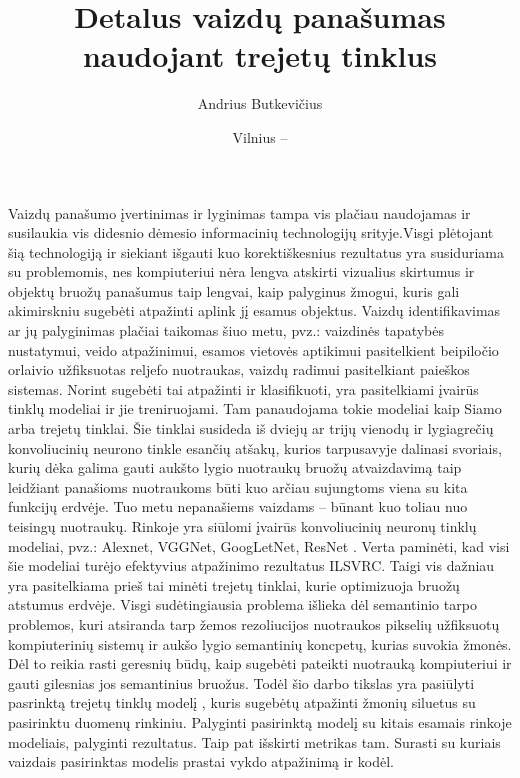 \documentclass{VUMIFPSkursinis}
\title{Detalus vaizdų panašumas naudojant trejetų tinklus}
\author{Andrius Butkevičius}
\date{Vilnius – \the\year }
\DeclareRobustCommand{\[}{\begin{equation}}
\DeclareRobustCommand{\]}{\end{equation}}
\begin{document}
\maketitle
\thispagestyle{empty} 

\tableofcontents



\thispagestyle{empty} 
Vaizdų panašumo įvertinimas ir lyginimas tampa vis plačiau naudojamas ir susilaukia vis didesnio dėmesio informacinių technologijų srityje.Visgi plėtojant šią technologiją ir siekiant išgauti kuo korektiškesnius rezultatus yra susiduriama su problemomis, nes kompiuteriui nėra lengva atskirti vizualius skirtumus ir objektų bruožų panašumus taip lengvai, kaip palyginus žmogui, kuris gali akimirskniu sugebėti atpažinti aplink jį esamus objektus. Vaizdų identifikavimas ar jų palyginimas plačiai taikomas šiuo metu, pvz.: vaizdinės tapatybės nustatymui, veido atpažinimui, esamos vietovės aptikimui pasitelkient beipiločio orlaivio užfiksuotas reljefo nuotraukas, vaizdų radimui pasitelkiant paieškos sistemas. Norint sugebėti tai atpažinti ir klasifikuoti, yra pasitelkiami įvairūs tinklų modeliai ir jie treniruojami. Tam panaudojama tokie modeliai kaip Siamo arba trejetų tinklai. Šie tinklai susideda iš dviejų ar trijų vienodų ir lygiagrečių konvoliucinių neurono tinkle esančių atšakų, kurios tarpusavyje dalinasi svoriais, kurių dėka galima gauti aukšto lygio nuotraukų bruožų atvaizdavimą taip leidžiant panašioms nuotraukoms būti kuo arčiau sujungtoms viena su kita funkcijų erdvėje. Tuo metu nepanašiems vaizdams – būnant kuo toliau nuo teisingų nuotraukų. 
\newline	
Rinkoje yra siūlomi įvairūs konvoliucinių neuronų tinklų modeliai, pvz.: Alexnet, VGGNet, GoogLetNet, ResNet \cite{Aerial_image_similarity}. Verta paminėti, kad visi šie modeliai turėjo efektyvius atpažinimo rezultatus ILSVRC. Taigi vis dažniau yra pasitelkiama prieš tai minėti trejetų tinklai, kurie optimizuoja bruožų atstumus erdvėje. Visgi sudėtingiausia problema išlieka dėl semantinio tarpo problemos, kuri atsiranda tarp žemos rezoliucijos nuotraukos pikselių užfiksuotų kompiuterinių sistemų ir aukšo lygio semantinių koncpetų, kurias suvokia žmonės. Dėl to reikia rasti geresnių būdų, kaip sugebėti pateikti nuotrauką kompiuteriui ir gauti gilesnias jos semantinius bruožus. 
\newline
Todėl šio darbo tikslas yra pasiūlyti pasrinktą trejetų tinklų modelį \cite{Aerial_image_similarity}, kuris sugebėtų atpažinti žmonių siluetus su pasirinktu duomenų rinkiniu. Palyginti pasirinktą modelį su kitais esamais rinkoje modeliais, palyginti rezultatus. Taip pat išskirti metrikas tam. Surasti su kuriais vaizdais pasirinktas modelis prastai vykdo atpažinimą ir kodėl.
\end{document}
